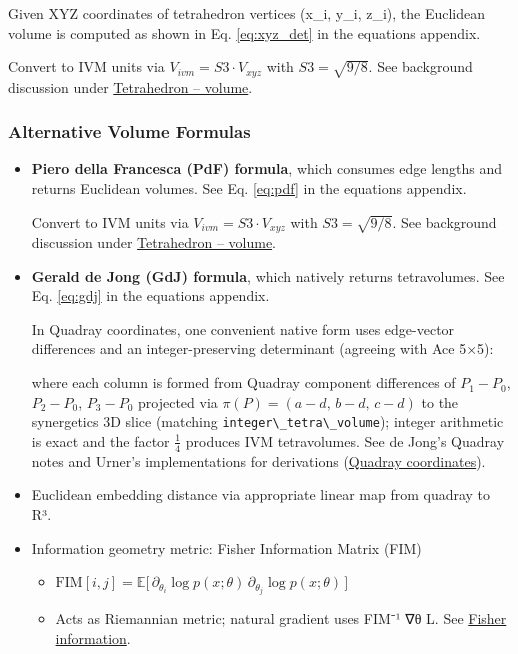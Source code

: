 \documentclass[
  10pt,
]{article}
\newcommand{\passthrough}[1]{#1}
\providecommand{\tightlist}{%
  \setlength{\itemsep}{0pt}\setlength{\parskip}{0pt}}
\begin{document}
Given XYZ coordinates of tetrahedron vertices (x\_i, y\_i, z\_i), the
Euclidean volume is computed as shown in Eq. \eqref{eq:xyz_det} in the
equations appendix.

Convert to IVM units via \(V_{ivm} = S3 \cdot V_{xyz}\) with
\(S3=\sqrt{9/8}\). See background discussion under
\href{https://en.wikipedia.org/wiki/Tetrahedron\#Volume}{Tetrahedron --
volume}.

\subsubsection{Alternative Volume
Formulas}\label{alternative-volume-formulas}

\begin{itemize}
\item
  \textbf{Piero della Francesca (PdF) formula}, which consumes edge
  lengths and returns Euclidean volumes. See Eq. \eqref{eq:pdf} in the
  equations appendix.

  Convert to IVM units via \(V_{ivm} = S3 \cdot V_{xyz}\) with
  \(S3=\sqrt{9/8}\). See background discussion under
  \href{https://en.wikipedia.org/wiki/Tetrahedron\#Volume}{Tetrahedron
  -- volume}.
\item
  \textbf{Gerald de Jong (GdJ) formula}, which natively returns
  tetravolumes. See Eq. \eqref{eq:gdj} in the equations appendix.

  In Quadray coordinates, one convenient native form uses edge-vector
  differences and an integer-preserving determinant (agreeing with Ace
  5×5):

  where each column is formed from Quadray component differences of
  \(P_1-P_0\), \(P_2-P_0\), \(P_3-P_0\) projected via
  \(\pi(P) = (a - d,\, b - d,\, c - d)\) to the synergetics 3D slice
  (matching \passthrough{\lstinline!integer\_tetra\_volume!}); integer
  arithmetic is exact and the factor \(\tfrac{1}{4}\) produces IVM
  tetravolumes. See de Jong's Quadray notes and Urner's implementations
  for derivations
  (\href{https://en.wikipedia.org/wiki/Quadray_coordinates}{Quadray
  coordinates}).
\item
  Euclidean embedding distance via appropriate linear map from quadray
  to R³.
\item
  Information geometry metric: Fisher Information Matrix (FIM)

  \begin{itemize}
  \tightlist
  \item
    \(\mathrm{FIM}[i,j] = \mathbb{E}\big[\, \partial_{\theta_i} \log p(x;\theta)\,\partial_{\theta_j} \log p(x;\theta)\,\big]\)
  \item
    Acts as Riemannian metric; natural gradient uses FIM⁻¹ ∇θ L. See
    \href{https://en.wikipedia.org/wiki/Fisher_information}{Fisher
    information}.
  \end{itemize}
\end{itemize}
\end{document}
